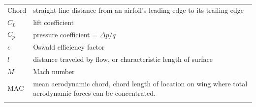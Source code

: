 \documentclass[
]{book}
\begin{document}
\begin{longtable}[]{@{}ll@{}}
\begin{minipage}[t]{0.22\columnwidth}
Chord\strut
\end{minipage} & \begin{minipage}[t]{0.72\columnwidth}\raggedright
straight-line distance from an airfoil's leading edge to its trailing edge\strut
\end{minipage}\tabularnewline
\begin{minipage}[t]{0.22\columnwidth}\raggedright
\(C_L\)\strut
\end{minipage} & \begin{minipage}[t]{0.72\columnwidth}\raggedright
lift coefficient\strut
\end{minipage}\tabularnewline
\begin{minipage}[t]{0.22\columnwidth}\raggedright
\(C_p\)\strut
\end{minipage} & \begin{minipage}[t]{0.72\columnwidth}\raggedright
pressure coefficient = \(\Delta p/q\)\strut
\end{minipage}\tabularnewline
\begin{minipage}[t]{0.22\columnwidth}\raggedright
\(e\)\strut
\end{minipage} & \begin{minipage}[t]{0.72\columnwidth}\raggedright
Oswald efficiency factor\strut
\end{minipage}\tabularnewline
\begin{minipage}[t]{0.22\columnwidth}\raggedright
\(l\)\strut
\end{minipage} & \begin{minipage}[t]{0.72\columnwidth}\raggedright
distance traveled by flow, or characteristic length of surface\strut
\end{minipage}\tabularnewline
\begin{minipage}[t]{0.22\columnwidth}\raggedright
\(M\)\strut
\end{minipage} & \begin{minipage}[t]{0.72\columnwidth}\raggedright
Mach number\strut
\end{minipage}\tabularnewline
\begin{minipage}[t]{0.22\columnwidth}\raggedright
\(\mathrm{MAC}\)\strut
\end{minipage} & \begin{minipage}[t]{0.72\columnwidth}\raggedright
mean aerodynamic chord, chord length of location on wing where total aerodynamic forces can be concentrated.\strut
\end{minipage}\tabularnewline
\begin{minipage}[t]{0.22\columnwidth}\raggedright

\end{minipage}
\end{longtable}
\end{document}
